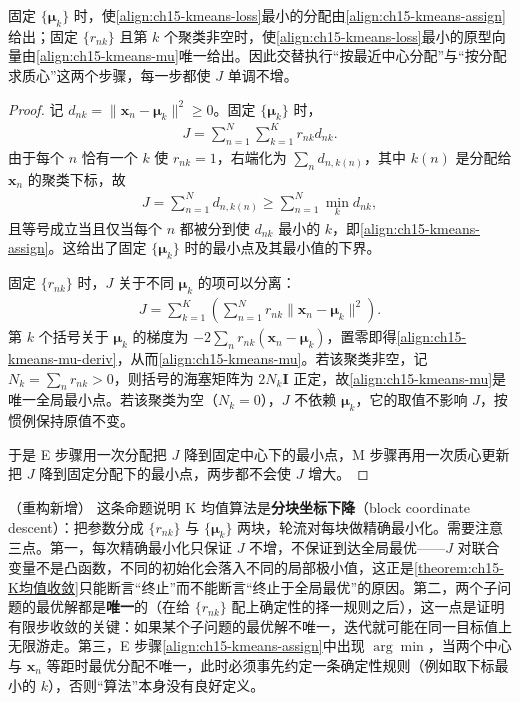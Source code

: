 \documentclass[../../main.tex]{subfiles}
\begin{document}
\begin{proposition}[K 均值算法的两步闭式更新]\label{proposition:ch15-K均值闭式更新}
固定 $\{\bm{\mu}_k\}$ 时，使\eqref{align:ch15-kmeans-loss}最小的分配由\eqref{align:ch15-kmeans-assign}给出；固定 $\{r_{nk}\}$ 且第 $k$ 个聚类非空时，使\eqref{align:ch15-kmeans-loss}最小的原型向量由\eqref{align:ch15-kmeans-mu}唯一给出。因此交替执行“按最近中心分配”与“按分配求质心”这两个步骤，每一步都使 $J$ 单调不增。
\end{proposition}
\begin{proof}
记 $d_{nk}=\|\bm{x}_n-\bm{\mu}_k\|^2\geqslant0$。固定 $\{\bm{\mu}_k\}$ 时，
\begin{align*}
J=\sum_{n=1}^{N}\sum_{k=1}^{K}r_{nk}d_{nk}.
\end{align*}
由于每个 $n$ 恰有一个 $k$ 使 $r_{nk}=1$，右端化为 $\sum_{n}d_{n,k(n)}$，其中 $k(n)$ 是分配给 $\bm{x}_n$ 的聚类下标，故
\begin{align*}
J=\sum_{n=1}^{N}d_{n,k(n)}\geqslant\sum_{n=1}^{N}\min_k d_{nk},
\end{align*}
且等号成立当且仅当每个 $n$ 都被分到使 $d_{nk}$ 最小的 $k$，即\eqref{align:ch15-kmeans-assign}。这给出了固定 $\{\bm{\mu}_k\}$ 时的最小点及其最小值的下界。

固定 $\{r_{nk}\}$ 时，$J$ 关于不同 $\bm{\mu}_k$ 的项可以分离：
\begin{align*}
J=\sum_{k=1}^{K}\left(\sum_{n=1}^{N}r_{nk}\|\bm{x}_n-\bm{\mu}_k\|^{2}\right).
\end{align*}
第 $k$ 个括号关于 $\bm{\mu}_k$ 的梯度为 $-2\sum_n r_{nk}(\bm{x}_n-\bm{\mu}_k)$，置零即得\eqref{align:ch15-kmeans-mu-deriv}，从而\eqref{align:ch15-kmeans-mu}。若该聚类非空，记 $N_k=\sum_n r_{nk}>0$，则括号的海塞矩阵为 $2N_k\bm{I}$ 正定，故\eqref{align:ch15-kmeans-mu}是唯一全局最小点。若该聚类为空（$N_k=0$），$J$ 不依赖 $\bm{\mu}_k$，它的取值不影响 $J$，按惯例保持原值不变。

于是 E 步骤用一次分配把 $J$ 降到固定中心下的最小点，M 步骤再用一次质心更新把 $J$ 降到固定分配下的最小点，两步都不会使 $J$ 增大。
\end{proof}

\begin{remark}（重构新增）
这条命题说明 K 均值算法是\textbf{分块坐标下降}（block coordinate descent）：把参数分成 $\{r_{nk}\}$ 与 $\{\bm{\mu}_k\}$ 两块，轮流对每块做精确最小化。需要注意三点。第一，每次精确最小化只保证 $J$ 不增，不保证到达全局最优——$J$ 对联合变量不是凸函数，不同的初始化会落入不同的局部极小值，这正是\cref{theorem:ch15-K均值收敛}只能断言“终止”而不能断言“终止于全局最优”的原因。第二，两个子问题的最优解都是\textbf{唯一}的（在给 $\{r_{nk}\}$ 配上确定性的择一规则之后），这一点是证明有限步收敛的关键：如果某个子问题的最优解不唯一，迭代就可能在同一目标值上无限游走。第三，E 步骤\eqref{align:ch15-kmeans-assign}中出现 $\arg\min$，当两个中心与 $\bm{x}_n$ 等距时最优分配不唯一，此时必须事先约定一条确定性规则（例如取下标最小的 $k$），否则“算法”本身没有良好定义。
\end{remark}
\end{document}
